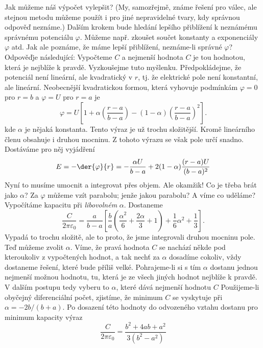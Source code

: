    Jak můžeme náš výpočet vylepšit? (My, samozřejmě, známe řešení pro válec, ale stejnou metodu
    můžeme použít i pro jiné nepravidelné tvary, kdy správnou odpověď neznáme.) Dalším krokem bude
    hledání lepšího přiblížení k neznámému správnému potenciálu \(\varphi\). Můžeme např. zkoušet
    součet konstanty a exponenciály \(\varphi\) atd. Jak ale poznáme, že máme lepší přiblížení,
    neznáme-li správné \(\varphi\)? Odpověďje následující: Vypočteme \(C\) a nejmenší hodnota \(C\)
    je tou hodnotou, která je nejblíže k pravdě. Vyzkoušejme tuto myšlenku. Předpokládejme, že
    potenciál není lineární, ale kvadratický v \(r\), tj. že elektrické pole není konstantní, ale
    lineární. Neobecnější kvadratickou formou, která vyhovuje podmínkám \(\varphi = 0\) pro \(r=b\)
    a \(\varphi=U\) pro \(r=a\) je
    \begin{equation*}
      \varphi = U\left[1 + \alpha \left(\dfrac{r-a}{b-a}\right) 
                    - (1 - \alpha)\left(\dfrac{r-a}{b-a}\right)^2\right].
    \end{equation*}
    kde \(\alpha\) je nějaká konstanta. Tento výraz je už trochu složitější. Kromě lineárního členu
    obsahuje i druhou mocninu. Z tohoto výrazu se však pole určí snadno. Dostáváme pro něj vyjádření
    \begin{equation*}
      E = -\der{\varphi}{r} = - \dfrac{\alpha U}{b-a} + 2(1 - \alpha)\dfrac{(r-a)U}{(b-a)^2}
    \end{equation*}
    Nyní to musíme umocnit a integrovat přes objem. Ale okamžik! Co je třeba brát jako \(\alpha\)?
    Za \(\varphi\) můžeme vzít parabolu; jenže jakou parabolu? A víme co uděláme? Vypočítáme
    kapacitu při \emph{libovolném} \(\alpha\). Dostaneme
    \begin{equation*}
      \dfrac{C}{2\pi\varepsilon_0} = 
      \dfrac{a}{b-a}\left[
          \dfrac{b}{a}\left(\dfrac{\alpha^2}{6}+\dfrac{2\alpha}{3}+1\right) + 
          \dfrac{1}{6}\alpha^2+\dfrac{1}{3}
      \right].
    \end{equation*}
    Vypadá to trochu složitě, ale to proto, že jsme integrovali druhou mocninu pole. Teď můžeme
    zvolit \(\alpha\). Víme, že pravá hodnota \(C\) se nachází někde pod kteroukoliv z vypočtených
    hodnot, a tak nechť za \(\alpha\) dosadíme cokoliv, vždy dostaneme řešení, které bude příliš
    velké. Pohrajeme-li si s tím \(\alpha\) dostanu jednou nejmenší možnou hodnotu, tu, která je ze
    všech jiných hodnot nejblíže k pravdě. V dalším postupu tedy vyberu to \(\alpha\), které dává
    nejmenší hodnotu \(C\) Použijeme-li obyčejný diferenciální počet, zjistíme, že minimum \(C\) se
    vyskytuje při \(\alpha = - 2 b/(b + a)\). Po dosazení této hodnoty do odvozeného vztahu dostanu
    pro minimum kapacity výraz
    \begin{equation*}
      \dfrac{C}{2\pi\varepsilon_0} = \dfrac{b^2 + 4ab + a^2}{3(b^2 - a^2)}
    \end{equation*}

